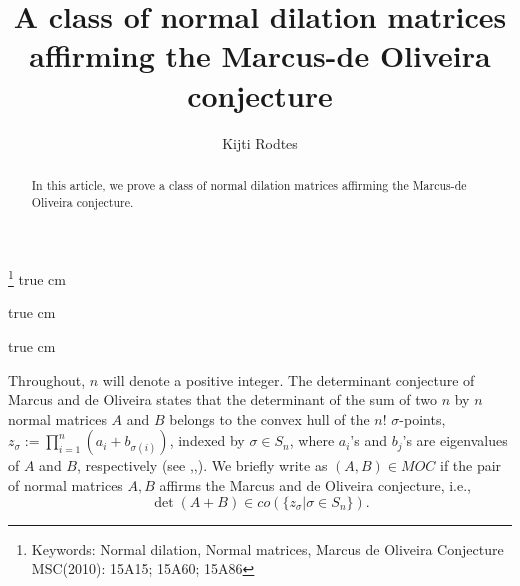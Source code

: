 \documentclass[11pt]{amsart}
\numberwithin{equation}{section}
\numberwithin{equation}{section}
\begin{document}
\leftline{ \scriptsize}


\vspace{1.3 cm}
\title
{A class of normal dilation matrices affirming the Marcus-de Oliveira conjecture}
\author{Kijti Rodtes}
\thanks{{\scriptsize
\newline Keywords: Normal dilation, Normal matrices, Marcus de Oliveira Conjecture\\ MSC(2010): 15A15; 15A60; 15A86}}
 true cm

\maketitle




\begin{abstract}  In this article, we prove a class of normal dilation matrices affirming the Marcus-de Oliveira conjecture.
\end{abstract}

 true cm


\pagestyle{myheadings}
%
         {\leftline{\scriptsize }}
\bigskip
\bigskip


 true cm

Throughout, $n$ will denote a positive integer.  The determinant conjecture of Marcus and de Oliveira states that the determinant of the sum of two $n$ by $n$ normal matrices $A$ and $B$ belongs to the convex hull of the $n!$ $\sigma$-points, $z_\sigma:=\prod _{i=1}^n (a_i+b_{\sigma(i)})$, indexed by $\sigma\in S_n$, where $a_i$'s and $b_j$'s are eigenvalues of $A$ and $B$, respectively (see \cite{Marcus},\cite{Oliveira},\cite{zhan}).  We briefly write as $(A,B)\in MOC$ if the pair of normal matrices $A,B$ affirms the Marcus and de Oliveira conjecture, i.e., $$ \det(A+B)\in co( \{z_\sigma | \sigma \in S_n \}).$$  
\end{document}

